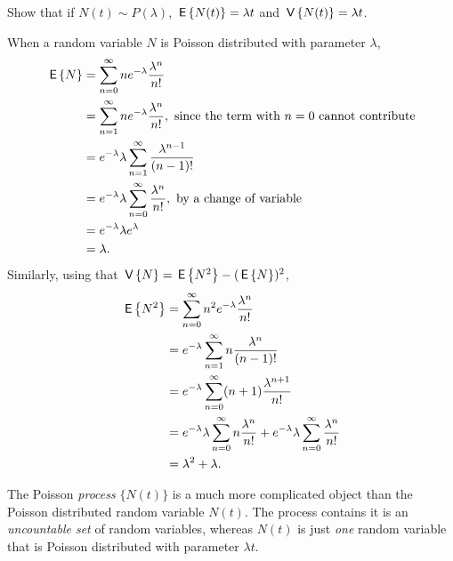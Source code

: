 \begin{exercise}
  Show that if $N(t)\sim P(\lambda)$, $\,\mathsf{E}\left\{N(t)\right\} = \lambda t$ and $\,\mathsf{V}\left\{N(t)\right\} = \lambda t$. 
  \begin{solution} 
    When a random variable $N$ is Poisson distributed with parameter
    $\lambda$,
    \begin{equation*}
      \begin{split}
      \,\mathsf{E}\left\{N\right\} 
&= \sum_{n=0}^\infty n e^{-\lambda}\frac{\lambda^n}{n!}  \\
&= \sum_{n=1}^\infty n e^{-\lambda}\frac{\lambda^n}{n!}, \text{ since the term with $n=0$ cannot contribute} \\
&= e^{-\lambda} \lambda \sum_{n=1}^\infty \frac{\lambda^{n-1}}{(n-1)!} \\
&= e^{-\lambda} \lambda \sum_{n=0}^\infty \frac{\lambda^{n}}{n!}, \text{ by a change of variable}\\
&= e^{-\lambda} \lambda e^{\lambda} \\
&= \lambda.
      \end{split}
    \end{equation*}
Similarly, using that $\,\mathsf{V}\left\{N\right\} = \,\mathsf{E}\left\{N^2\right\} - (\,\mathsf{E}\left\{N\right\})^2$, 
    \begin{equation*}
      \begin{split}
      \,\mathsf{E}\left\{N^2\right\}
&= \sum_{n=0}^\infty n^2 e^{-\lambda}\frac{\lambda^n}{n!}  \\
&= e^{-\lambda} \sum_{n=1}^\infty n \frac{\lambda^n}{(n-1)!}  \\
&= e^{-\lambda} \sum_{n=0}^\infty (n+1) \frac{\lambda^{n+1}}{n!}  \\
&= e^{-\lambda} \lambda \sum_{n=0}^\infty n \frac{\lambda^{n}}{n!}  +e^{-\lambda}\lambda \sum_{n=0}^\infty\frac{\lambda^{n}}{n!}  \\
&= \lambda^2  + \lambda.
\end{split}
\end{equation*}

The Poisson \emph{process} $\{N(t)\}$ is a much more complicated
object than the Poisson distributed random variable $N(t)$. The
process contains it is an \emph{ uncountable set} of random variables,
whereas $N(t)$ is just \emph{one} random variable that is Poisson
distributed with parameter $\lambda t$. 
\end{solution}
\end{exercise}


